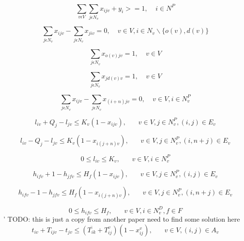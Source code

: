 \documentclass[a4paper,12pt]{article}
\begin{document}
\begin{equation} \label{eq:3}
    \sum_{v\epsilon V}\sum_{j\epsilon N_v}x_{ijv} + y_i >= 1, ~~~~~ i \in N^P
\end{equation}

\begin{equation} \label{eq:4}
    \sum_{j\epsilon N_v}x_{ijv} - \sum_{j\epsilon N_v}x_{jiv} = 0, ~~~~~ v \in V, i\in N_v \backslash \{o(v), d(v)\} 
\end{equation}

\begin{equation} \label{eq:5}
    \sum_{j\epsilon N_v}x_{o(v)jv} = 1, ~~~~~ v \in V
\end{equation}

\begin{equation} \label{eq:6}
    \sum_{j\epsilon N_v}x_{j d(v)v} = 1, ~~~~~ v \in V
\end{equation}

\begin{equation} \label{eq:7}
    \sum_{j\epsilon N_v}x_{ijv} - \sum_{j\epsilon N_v}x_{(i+n)jv} = 0, ~~~~~ v \in V, i\in N^P_v
\end{equation}

\begin{equation} \label{eq:8}
    l_{iv} + Q_j - l_{jv} \leq K_v(1-x_{ijv}),~~~~~~~~ v \in V,j\in N_v^P,(i,j) \in E_v
\end{equation}

\begin{equation} \label{eq:9}
    l_{iv} - Q_j - l_{jv} \leq K_v(1-x_{i(j+n)v}), ~~~~~~~~ v \in V,j\in N_v^P, (i, n+j)\in E_v
\end{equation}

\begin{equation} \label{eq:10}
0 \leq l_{iv} \leq K_v, ~~~~~~~~ v \in V, i \in N^P_v
\end{equation}

\begin{equation} \label{eq:11}
    h_{ifv} + 1 - h_{jfv} \leq H_f(1-x_{ijv}), ~~~~~~~~ v \in V,j\in N_v^P, (i, j)\in E_v
\end{equation}

\begin{equation} \label{eq:12}
    h_{ifv} - 1 - h_{jfv} \leq H_f(1-x_{i(j+n)v}), ~~~~~~~~ v \in V,j\in N_v^P, (i, n+j)\in E_v
\end{equation}

\begin{equation} \label{eq:13}
0 \leq h_{ifv} \leq H_f, ~~~~~~~~ v \in V, i \in N^D_v, f \in F
\end{equation}'
TODO: this is just a copy from another paper need to find some solution here
\begin{equation} \label{eq:14}
    t_{iv} + T_{ijv} - t_{jv} \leq (\overline{T_{ik}} + T_{ij}^v)(1 - x_{ij}^v), ~~~~~~~~ v \in V, (i,j) \in A_v
\end{equation}
\end{document}
